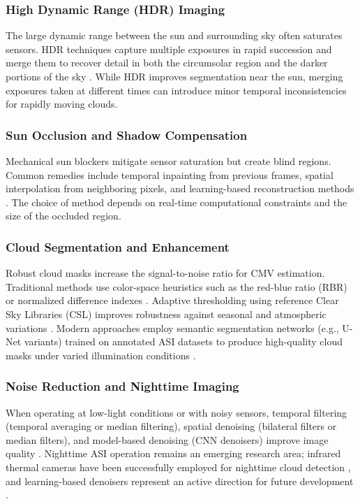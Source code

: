 \subsubsection*{High Dynamic Range (HDR) Imaging}
The large dynamic range between the sun and surrounding sky often saturates sensors. HDR techniques capture multiple exposures in rapid succession and merge them to recover detail in both the circumsolar region and the darker portions of the sky \cite{urquhart2016}. While HDR improves segmentation near the sun, merging exposures taken at different times can introduce minor temporal inconsistencies for rapidly moving clouds.

\subsubsection*{Sun Occlusion and Shadow Compensation}
Mechanical sun blockers mitigate sensor saturation but create blind regions. Common remedies include temporal inpainting from previous frames, spatial interpolation from neighboring pixels, and learning-based reconstruction methods \cite{peng2023hybrid,li2021}. The choice of method depends on real-time computational constraints and the size of the occluded region.

\subsubsection*{Cloud Segmentation and Enhancement}
Robust cloud masks increase the signal-to-noise ratio for CMV estimation. Traditional methods use color-space heuristics such as the red-blue ratio (RBR) or normalized difference indexes \cite{long2006,dev2017}. Adaptive thresholding using reference Clear Sky Libraries (CSL) improves robustness against seasonal and atmospheric variations \cite{dev2016}. Modern approaches employ semantic segmentation networks (e.g., U-Net variants) trained on annotated ASI datasets to produce high-quality cloud masks under varied illumination conditions \cite{dev2019,nouri2021skycam}.

\subsubsection*{Noise Reduction and Nighttime Imaging}
When operating at low-light conditions or with noisy sensors, temporal filtering (temporal averaging or median filtering), spatial denoising (bilateral filters or median filters), and model-based denoising (CNN denoisers) improve image quality \cite{sommer2025infrared}. Nighttime ASI operation remains an emerging research area; infrared thermal cameras have been successfully employed for nighttime cloud detection \cite{lagrosas2021,shi2024nighttime}, and learning-based denoisers represent an active direction for future development \cite{sommer2025infrared}.

